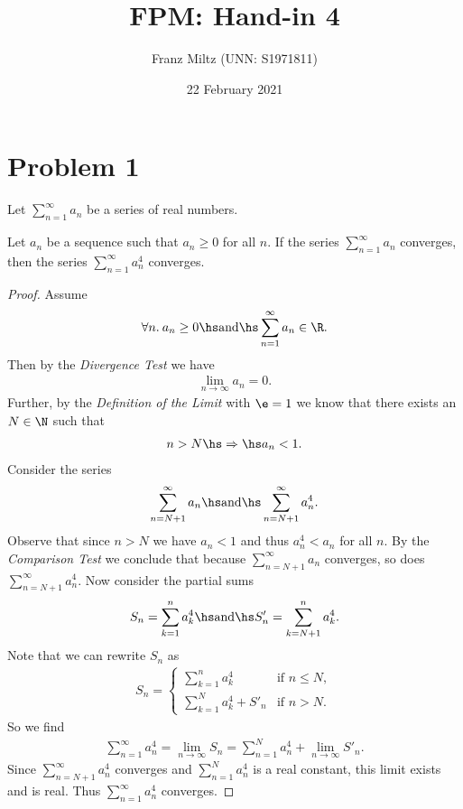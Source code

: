 \documentclass{article}
\begin{document}
\title{FPM: Hand-in 4}
\author{Franz Miltz (UNN: S1971811)}
\date{22 February 2021}
\maketitle

\section*{Problem 1}

Let $\sum_{n=1}^\infty a_n$ be a series of real numbers.

\setcounter{section}{1}
\begin{claim}
    Let $a_n$ be a sequence such that $a_n\geq 0$ for all $n$. If the
    series $\sum_{n=1}^\infty a_n$ converges, then the series
    $\sum_{n=1}^\infty a_n^4$ converges.
\end{claim}
\begin{proof}
    Assume \begin{align*}
        \forall n.\:a_n\geq 0\hs\text{and}\hs \sum_{n=1}^\infty a_n \in \R.
    \end{align*}
    Then by the \emph{Divergence Test} we have
    \begin{align*}
        \lim_{n\to\infty} a_n = 0.
    \end{align*}
    Further, by the \emph{Definition of the Limit} with $\e = 1$
    we know that there exists an $N\in\N$ such that
    \begin{align*}
        n > N\hs\Rightarrow\hs a_n < 1.
    \end{align*}
    Consider the series
    \begin{align*}
        \sum_{n=N+1}^\infty a_n \hs\text{and}\hs \sum_{n=N+1}^\infty a_n^4.
    \end{align*}
    Observe that since $n>N$ we have $a_n<1$ and thus $a_n^4 < a_n$ for all
    $n$. By the \emph{Comparison Test} we conclude that because 
    $\sum_{n=N+1}^\infty a_n$ converges, so does $\sum_{n=N+1}^\infty a_n^4$.
    Now consider the partial sums
    \begin{align*}
        S_n = \sum_{k=1}^n a_k^4 \hs\text{and}\hs S'_n = \sum_{k=N+1}^n a_k^4.
    \end{align*}
    Note that we can rewrite $S_n$ as
    \begin{align*}
        S_n = \begin{cases}
            \sum_{k=1}^n a_k^4 &\text{if }n \leq N,\\
            \sum_{k=1}^{N} a_k^4 + S'_n &\text{if }n>N.
        \end{cases}
    \end{align*}
    So we find
    \begin{align*}
        \sum_{n=1}^\infty a_n^4 = \lim_{n\to\infty} S_n 
        = \sum_{n=1}^N a_n^4 + \lim_{n\to\infty} S'_n.
    \end{align*}
    Since $\sum_{n=N+1}^\infty a_n^4$ converges and $\sum_{n=1}^N a_n^4$ is
    a real constant, this limit exists and is real. Thus $\sum_{n=1}^\infty a_n^4$ converges.
\end{proof}
\end{document}

